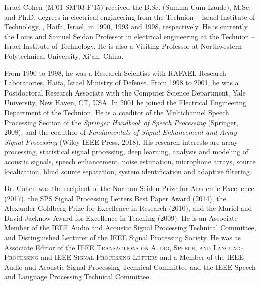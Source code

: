 \begin{IEEEbiography}{Israel Cohen} (M'01-SM'03-F'15)
received the B.Sc. (Summa Cum Laude), M.Sc.
and Ph.D. degrees in electrical engineering from the Technion -- Israel Institute of
Technology, , Haifa, Israel, in 1990, 1993 and 1998, respectively.
He is currently the Louis and Samuel Seidan Professor in electrical engineering at the Technion -- Israel Institute of Technology.
He is also a Visiting Professor at Northwestern Polytechnical University, Xi’an, China.

From 1990 to 1998, he was a Research Scientist with RAFAEL Research
Laboratories, Haifa, Israel Ministry of Defense. From 1998 to 2001,
he was a Postdoctoral Research Associate with the Computer Science
Department, Yale University, New Haven, CT, USA. In 2001 he joined the
Electrical Engineering Department of the Technion.
%
He is a coeditor of the Multichannel Speech
Processing Section of the \textit{Springer Handbook of Speech
Processing} (Springer, 2008), and the coauthor of \textit{Fundamentals of Signal Enhancement and Array Signal Processing} (Wiley-IEEE Press, 2018).
%
His research interests are array processing, statistical signal processing, deep learning,
analysis and modeling of acoustic signals, speech enhancement, noise
estimation, microphone arrays, source localization, blind source
separation, system identification and adaptive filtering.

Dr. Cohen was the recipient of the Norman Seiden Prize for Academic Excellence (2017),
the SPS Signal Processing Letters Best Paper Award (2014),
the Alexander Goldberg Prize for Excellence in Research (2010),
and the Muriel and David Jacknow Award for Excellence in Teaching (2009).
He is an Associate Member of the IEEE Audio and Acoustic Signal Processing Technical Committee, and Distinguished Lecturer of the IEEE Signal Processing Society.
He was as Associate Editor of the \textsc{IEEE Transactions on Audio, Speech, and Language
Processing} and \textsc{IEEE Signal Processing Letters} and a Member of the IEEE Audio and Acoustic Signal Processing Technical Committee and the IEEE Speech and Language Processing Technical Committee.

\end{IEEEbiography}
